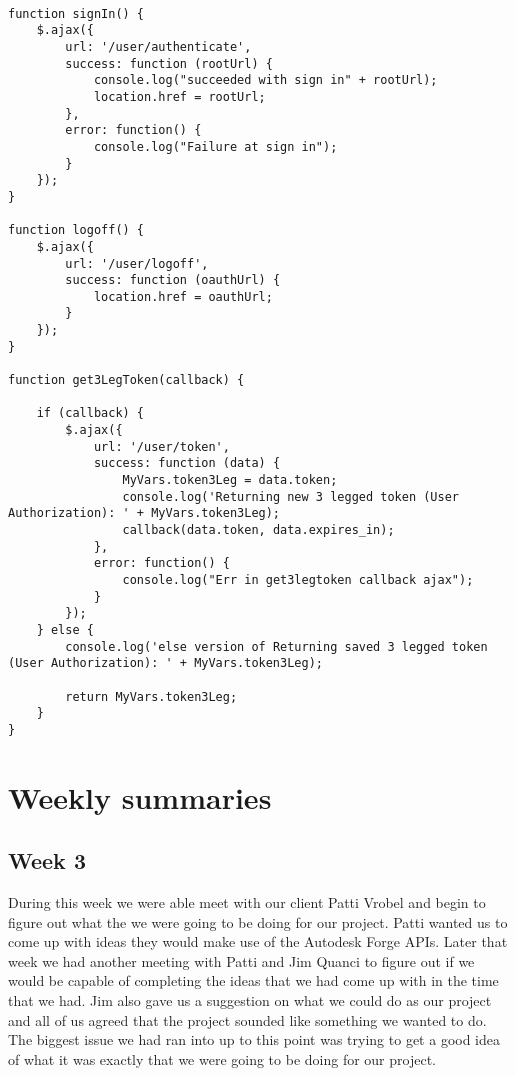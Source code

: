 \documentclass[10pt,draftclsnofoot,onecolumn]{IEEEtran}
\begin{document}
\begin{lstlisting}[caption=Login related functions]

function signIn() {
    $.ajax({
        url: '/user/authenticate',
        success: function (rootUrl) {
            console.log("succeeded with sign in" + rootUrl);
            location.href = rootUrl;
        },
        error: function() {
            console.log("Failure at sign in");
        }
    });
}

function logoff() {
    $.ajax({
        url: '/user/logoff',
        success: function (oauthUrl) {
            location.href = oauthUrl;
        }
    });
}

function get3LegToken(callback) {

    if (callback) {
        $.ajax({
            url: '/user/token',
            success: function (data) {
                MyVars.token3Leg = data.token;
                console.log('Returning new 3 legged token (User Authorization): ' + MyVars.token3Leg);
                callback(data.token, data.expires_in);
            },
            error: function() {
                console.log("Err in get3legtoken callback ajax");
            }
        });
    } else {
        console.log('else version of Returning saved 3 legged token (User Authorization): ' + MyVars.token3Leg);

        return MyVars.token3Leg;
    }
}
\end{lstlisting}


\section{Weekly summaries}
\subsection{Week 3}
During this week we were able meet with our client Patti Vrobel and begin to figure out what the we were going to be doing for our project. Patti wanted us to come up with ideas they would make use of the Autodesk Forge APIs. Later that week we had another meeting with Patti and Jim Quanci to figure out if we would be capable of completing the ideas that we had come up with in the time that we had. Jim also gave us a suggestion on what we could do as our project and all of us agreed that the project sounded like something we wanted to do. The biggest issue we had ran into up to this point was trying to get a good idea of what it was exactly that we were going to be doing for our project.   
\end{document}
